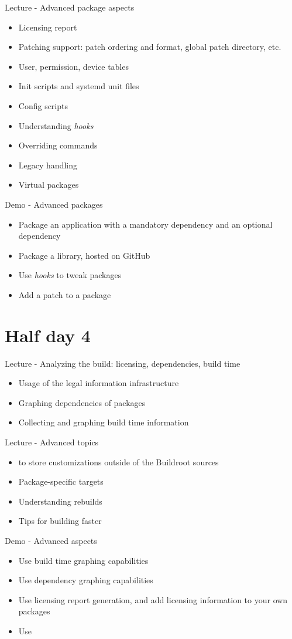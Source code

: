 \documentclass[a4paper,12pt,obeyspaces,spaces,hyphens]{article}
\begin{document}
\feagendatwocolumn
{Lecture - Advanced package aspects}
{
  \begin{itemize}
  \item Licensing report
  \item Patching support: patch ordering and format, global patch directory, etc.
  \item User, permission, device tables
  \item Init scripts and systemd unit files
  \item Config scripts
  \item Understanding {\em hooks}
  \item Overriding commands
  \item Legacy handling
  \item Virtual packages
  \end{itemize}
}
{Demo - Advanced packages}
{
  \begin{itemize}
  \item Package an application with a mandatory dependency and an
    optional dependency
  \item Package a library, hosted on GitHub
  \item Use {\em hooks} to tweak packages
  \item Add a patch to a package
  \end{itemize}
}


\section{Half day 4}

\feagendaonecolumn
{Lecture - Analyzing the build: licensing, dependencies, build time}
{
  \begin{itemize}
  \item Usage of the legal information infrastructure
  \item Graphing dependencies of packages
  \item Collecting and graphing build time information
  \end{itemize}
}

\feagendatwocolumn
{Lecture - Advanced topics}
{
  \begin{itemize}
  \item {} to store customizations outside of the
    Buildroot sources
  \item Package-specific targets
  \item Understanding rebuilds
  \item Tips for building faster
  \end{itemize}
}
{Demo - Advanced aspects}
{
  \begin{itemize}
  \item Use build time graphing capabilities
  \item Use dependency graphing capabilities
  \item Use licensing report generation, and add licensing
    information to your own packages
  \item Use 
  \end{itemize}
}
\end{document}
